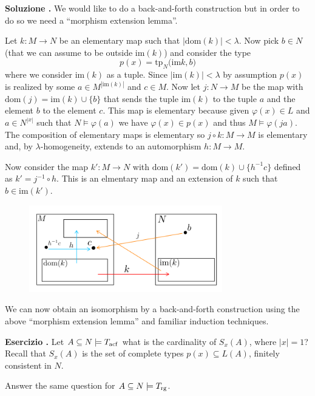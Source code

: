 \documentclass[10pt]{article}
\newcounter{ex}
\newenvironment{exercise}{\clearpage\addtocounter{ex}{1}\textbf{Esercizio \theex.\quad}}{}
\newcounter{sol}
\newenvironment{solution}{\addtocounter{sol}{1}\textbf{Soluzione \theex.\quad}}{}
\begin{document}
\begin{solution}
  We would like to do a back-and-forth construction but in order to do so we need a ``morphism extension lemma''.

  Let \(k\colon M\to N\) be an elementary map such that \(|\textrm{dom}(k)|<\lambda\).
  Now pick \(b\in N\) (that we can assume to be outside \(\textrm{im}(k)\)) and consider the type
  \[p(x) = \text{tp}_N\big(\textrm{im}k, b\big)\]
  where we consider \(\textrm{im}(k)\) as a tuple.
  Since \(|\textrm{im}(k)|<\lambda\) by assumption \(p(x)\) is realized by some \(a\in M^{|\textrm{im}(k)|}\) and \(c\in M\).
  Now let \(j\colon N\to M\) be the map with \(\textrm{dom}(j) = \textrm{im}(k) \cup \{b\}\) that sends the tuple \(\textrm{im}(k)\) to the tuple \(a\) and the element \(b\) to the element \(c\).
  This map is elementary because given \(\varphi(x)\in L\) and \(a\in N^{|x|}\) such that \(N\models\varphi(a)\) we have \(\varphi(x)\in p(x)\) and thus \(M\models \varphi(ja)\).
  The composition of elementary maps is elementary so \(j\circ k\colon M\to M\) is elementary and, by \(\lambda\)-homogeneity, extends to an automorphism \(h\colon M\to M\).

  Now consider the map \(k'\colon M\to N\) with \(\textrm{dom}(k') = \textrm{dom}(k)\cup \big\{h^{-1}c\big\}\) defined as \(k' = j^{-1}\circ h\).
  This is an elmentary map and an extension of \(k\) such that \(b\in \textrm{im}(k')\).
  \begin{figure}[h]
    \begin{center}
      \includegraphics[width=0.75\textwidth]{fig1.png}
    \end{center}
  \end{figure}
  
  We can now obtain an isomorphism by a back-and-forth construction using the above ``morphism extension lemma'' and familiar induction techniques.
\end{solution}

\begin{exercise}
  Let $A\subseteq N\models T_{\rm acf}$ what is the cardinality of $S_x(A)$, where $|x|=1$? Recall that $S_x(A)$ is the set of complete types $p(x)\subseteq L(A)$, finitely consistent in $N$.

  Answer the same question for $A\subseteq N\models T_{\rm rg}$.
\end{exercise}
\end{document}
